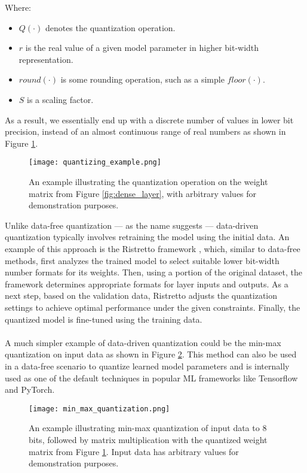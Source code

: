 \noindent Where:
\begin{itemize}
    \item $Q(\cdot)$ denotes the quantization operation.
    \item $r$ is the real value of a given model parameter in higher bit-width representation.
    \item $round(\cdot)$ is some rounding operation, such as a simple $floor(\cdot)$.
    \item $S$ is a scaling factor.
\end{itemize}

\noindent  As a result, we essentially end up with a discrete number of values in lower bit precision, 
instead of an almost continuous range of real numbers as shown in Figure \ref{fig:quantizing_example}.
\\
\begin{figure}[h!]
  \centering
  \texttt{[image: quantizing\_example.png]}
  \caption{An example illustrating the quantization operation on the weight matrix from Figure \ref{fig:dense_layer}, 
  with arbitrary values for demonstration purposes.}
  \label{fig:quantizing_example}
\end{figure}

\noindent Unlike data-free quantization  —  as the name suggests — data-driven quantization typically involves retraining the model
using the initial data. An example of this approach is the Ristretto framework \cite{DBLP:journals/tnn/GyselPMG18}, which, similar to data-free methods, 
first analyzes the trained model to select suitable lower bit-width number formats for its weights.
Then, using a portion of the original dataset, the framework determines appropriate formats for layer inputs and outputs.
As a next step, based on the validation data, Ristretto adjusts the quantization settings to achieve optimal performance 
under the given constraints. Finally, the quantized model is fine-tuned using the training data.
\\
\\
A much simpler example of data-driven quantization could be the min-max quantization on input data as shown in Figure \ref{fig:min_max_quantization}. 
This method can also be used in a data-free scenario to quantize learned model parameters and is internally used as one of the
default techniques in popular ML frameworks like Tensorflow and PyTorch.

\begin{figure}[h!]
  \centering
  \texttt{[image: min\_max\_quantization.png]}
  \caption{ An example illustrating min-max quantization of input data to 8 bits, followed by matrix multiplication with the quantized weight matrix from Figure \ref{fig:quantizing_example}.
  Input data has arbitrary values for demonstration purposes.}
  \label{fig:min_max_quantization}
\end{figure}

